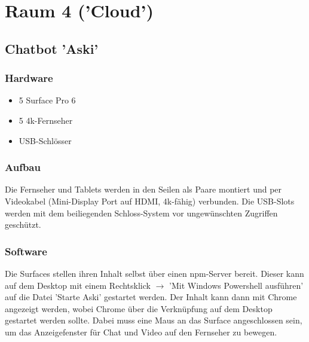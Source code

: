 \documentclass [titlepage,a4paper]{article}
\begin{document}
\newpage
\section{Raum 4 ('Cloud')}

\subsection{Chatbot 'Aski'}

\subsubsection{Hardware}

\begin{itemize}
\item 5 Surface Pro 6
\item 5 4k-Fernseher
\item USB-Schlösser
\end{itemize}

\subsubsection{Aufbau}

Die Fernseher und Tablets werden in den Seilen als Paare montiert und per Videokabel (Mini-Display Port auf HDMI, 4k-fähig) verbunden. Die USB-Slots werden mit dem beiliegenden Schloss-System vor ungewünschten Zugriffen geschützt.

\subsubsection{Software}

Die Surfaces stellen ihren Inhalt selbst über einen npm-Server bereit. Dieser kann auf dem Desktop mit einem Rechtsklick $\rightarrow$ 'Mit Windows Powershell ausführen' auf die Datei 'Starte Aski' gestartet werden. Der Inhalt kann dann mit Chrome angezeigt werden, wobei Chrome über die Verknüpfung auf dem Desktop gestartet werden sollte. Dabei muss eine Maus an das Surface angeschlossen sein, um das Anzeigefenster für Chat und Video auf den Fernseher zu bewegen.
\end{document}
